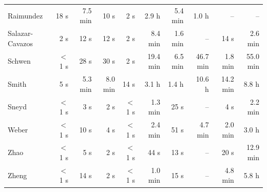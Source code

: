\begin{longtable}{@{}lrrrrrrrrr@{}}
Raimundez & 18 s & 7.5 min & 10 s & 2 s & 2.9 h & 5.4 min & 1.0 h & -- & -- \\
Salazar-Cavazos & 2 s & 12 s & 12 s & 2 s & 8.4 min & 1.6 min & -- & 14 s & 2.6 min \\
Schwen & $<$1 s & 28 s & 30 s & 2 s & 19.4 min & 6.5 min & 46.7 min & 1.8 min & 55.0 min \\
Smith & 5 s & 5.3 min & 8.0 min & 14 s & 3.1 h & 1.4 h & 10.6 h & 14.2 min & 8.8 h \\
Sneyd & $<$1 s & 3 s & 2 s & $<$1 s & 1.3 min & 25 s & -- & 4 s & 2.2 min \\
Weber & $<$1 s & 10 s & 4 s & $<$1 s & 2.4 min & 51 s & 4.7 min & 2.0 min & 3.0 h \\
Zhao & $<$1 s & 5 s & 2 s & $<$1 s & 44 s & 13 s & -- & 20 s & 12.9 min \\
Zheng & $<$1 s & 14 s & 2 s & $<$1 s & 1.0 min & 15 s & -- & 4.8 min & 5.8 h \\
\bottomrule
\end{longtable}
